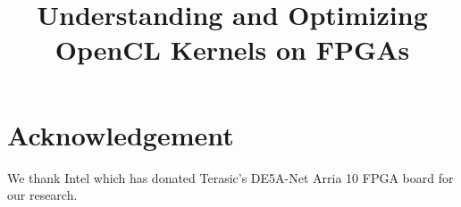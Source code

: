 \documentclass[sigconf]{acmart}
\begin{document}
	
\title{Understanding and Optimizing OpenCL Kernels on FPGAs}




\maketitle









\section{Acknowledgement}
\vspace{-1ex}

We thank Intel which has donated Terasic\textquoteright s DE5A-Net Arria 10 FPGA board for our research.



\end{document}
